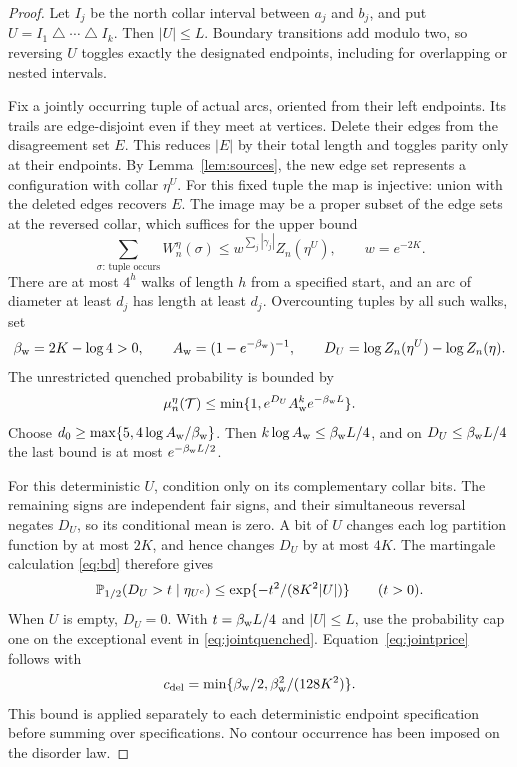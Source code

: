 \begin{proof}
Let $I_j$ be the north collar interval between $a_j$ and $b_j$, and put $U=I_1\mathbin{\triangle}\cdots\mathbin{\triangle}I_k$. Then $|U|\le L$. Boundary transitions add modulo two, so reversing $U$ toggles exactly the designated endpoints, including for overlapping or nested intervals.

Fix a jointly occurring tuple of actual arcs, oriented from their left endpoints. Its trails are edge-disjoint even if they meet at vertices. Delete their edges from the disagreement set $E$. This reduces $|E|$ by their total length and toggles parity only at their endpoints. By Lemma~\ref{lem:sources}, the new edge set represents a configuration with collar $\eta^U$. For this fixed tuple the map is injective: union with the deleted edges recovers $E$. The image may be a proper subset of the edge sets at the reversed collar, which suffices for the upper bound
\[
 \sum_{\sigma:\,\text{tuple occurs}}W_n^\eta(\sigma)
 \le w^{\sum_j|\gamma_j|}Z_n(\eta^U),\qquad w=e^{-2K}.
\]
There are at most $4^h$ walks of length $h$ from a specified start, and an arc of diameter at least $d_j$ has length at least $d_j$. Overcounting tuples by all such walks, set
\[
 \beta_{\rm w}=2K-\log4>0,\qquad
 A_{\rm w}=(1-e^{-\beta_{\rm w}})^{-1},\qquad
 D_U=\log Z_n(\eta^U)-\log Z_n(\eta).
\]
The unrestricted quenched probability is bounded by
\begin{equation}\label{eq:jointquenched}
 \mu_n^\eta(\mathcal T)
 \le\min\{1,e^{D_U}A_{\rm w}^k e^{-\beta_{\rm w}L}\}.
\end{equation}
Choose $d_0\ge\max\{5,4\log A_{\rm w}/\beta_{\rm w}\}$. Then $k\log A_{\rm w}\le\beta_{\rm w}L/4$, and on $D_U\le\beta_{\rm w}L/4$ the last bound is at most $e^{-\beta_{\rm w}L/2}$.

For this deterministic $U$, condition only on its complementary collar bits. The remaining signs are independent fair signs, and their simultaneous reversal negates $D_U$, so its conditional mean is zero. A bit of $U$ changes each log partition function by at most $2K$, and hence changes $D_U$ by at most $4K$. The martingale calculation \eqref{eq:bd} therefore gives
\[
 \mathbb P_{1/2}(D_U>t\mid\eta_{U^c})
 \le\exp\{-t^2/(8K^2|U|)\}\qquad(t>0).
\]
When $U$ is empty, $D_U=0$. With $t=\beta_{\rm w}L/4$ and $|U|\le L$, use the probability cap one on the exceptional event in \eqref{eq:jointquenched}. Equation~\eqref{eq:jointprice} follows with
\[
 c_{\rm del}=\min\{\beta_{\rm w}/2,\beta_{\rm w}^2/(128K^2)\}.
\]
This bound is applied separately to each deterministic endpoint specification before summing over specifications. No contour occurrence has been imposed on the disorder law.
\end{proof}

